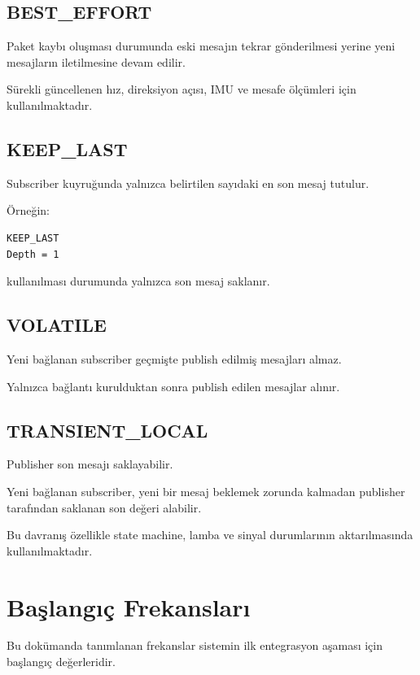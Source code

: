 \documentclass[12pt,a4paper]{article}
\begin{document}
\subsection{BEST\_EFFORT}

Paket kaybı oluşması durumunda eski mesajın tekrar gönderilmesi yerine
yeni mesajların iletilmesine devam edilir.

Sürekli güncellenen hız, direksiyon açısı, IMU ve mesafe ölçümleri için
kullanılmaktadır.

\subsection{KEEP\_LAST}

Subscriber kuyruğunda yalnızca belirtilen sayıdaki en son mesaj tutulur.

Örneğin:

\begin{verbatim}
KEEP_LAST
Depth = 1
\end{verbatim}

kullanılması durumunda yalnızca son mesaj saklanır.

\subsection{VOLATILE}

Yeni bağlanan subscriber geçmişte publish edilmiş mesajları almaz.

Yalnızca bağlantı kurulduktan sonra publish edilen mesajlar alınır.

\subsection{TRANSIENT\_LOCAL}

Publisher son mesajı saklayabilir.

Yeni bağlanan subscriber, yeni bir mesaj beklemek zorunda kalmadan
publisher tarafından saklanan son değeri alabilir.

Bu davranış özellikle state machine, lamba ve sinyal durumlarının
aktarılmasında kullanılmaktadır.

\section{Başlangıç Frekansları}

Bu dokümanda tanımlanan frekanslar sistemin ilk entegrasyon aşaması için
başlangıç değerleridir.
\end{document}
